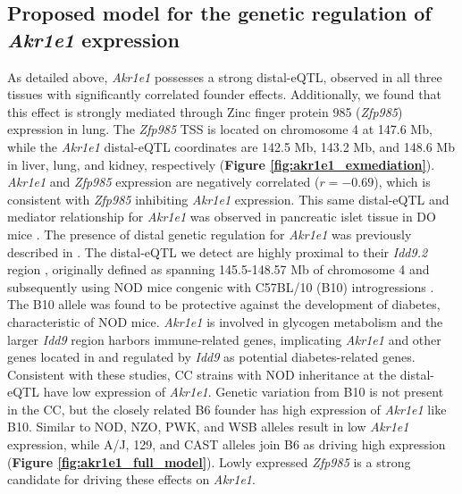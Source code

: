 \documentclass[9pt,twocolumn,twoside]{gsajnl}
\begin{document}
\subsection{Proposed model for the genetic regulation of \textit{Akr1e1} expression}

As detailed above, \textit{Akr1e1} possesses a strong distal-eQTL, observed in all three tissues with significantly correlated founder effects. Additionally, we found that this effect is strongly mediated through Zinc finger protein 985 (\textit{Zfp985}) expression in lung. The \textit{Zfp985} TSS is located on chromosome 4 at 147.6 Mb, while the \textit{Akr1e1} distal-eQTL coordinates are 142.5 Mb, 143.2 Mb, and 148.6 Mb in liver, lung, and kidney, respectively (\textbf{Figure \ref{fig:akr1e1_exmediation}}). \textit{Akr1e1} and \textit{Zfp985} expression are negatively correlated ($r = -0.69$), which is consistent with \textit{Zfp985} inhibiting \textit{Akr1e1} expression. This same distal-eQTL and mediator relationship for \textit{Akr1e1} was observed in pancreatic islet tissue in DO mice \citep{Keller2018}.
The presence of distal genetic regulation for \textit{Akr1e1} was previously described in \cite{HamiltonWilliams2013}. The distal-eQTL we detect are highly proximal to their \textit{Idd9.2} region \citep{HamiltonWilliams2010}, originally defined as spanning 145.5-148.57 Mb of chromosome 4 and subsequently using NOD mice congenic with C57BL/10 (B10) introgressions \cite{HamiltonWilliams2013}. The B10 allele was found to be protective against the development of diabetes, characteristic of NOD mice. \textit{Akr1e1} is involved in glycogen metabolism and the larger \textit{Idd9} region harbors immune-related genes, implicating \textit{Akr1e1} and other genes located in and regulated by \textit{Idd9} as potential diabetes-related genes. 
Consistent with these studies, CC strains with NOD inheritance at the distal-eQTL have low expression of \textit{Akr1e1}. Genetic variation from B10 is not present in the CC, but the closely related B6 founder has high expression of \textit{Akr1e1} like B10. Similar to NOD, NZO, PWK, and WSB alleles result in low \textit{Akr1e1} expression, while A/J, 129, and CAST alleles join B6 as driving high expression (\textbf{Figure \ref{fig:akr1e1_full_model}}). Lowly expressed \textit{Zfp985} is a strong candidate for driving these effects on \textit{Akr1e1}.
\end{document}
